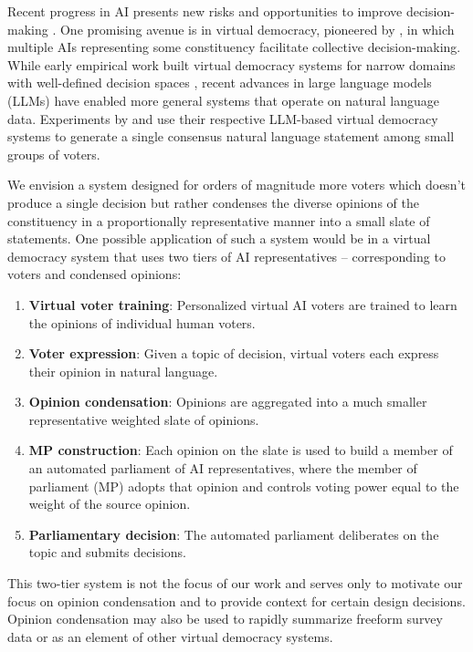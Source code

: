 \documentclass[11pt]{article}
\begin{document}
Recent progress in AI presents new risks and opportunities to improve decision-making \citep{landemore}. One promising avenue is in virtual democracy, pioneered by \citet{noothigattu-2018}, in which multiple AIs representing some constituency facilitate collective decision-making. While early empirical work built virtual democracy systems for narrow domains with well-defined decision spaces \citep{kahng-virtual-democracy, freedman-kidney-exchange}, recent advances in large language models (LLMs) have enabled more general systems that operate on natural language data. Experiments by \citet{bakker-consensus} and \citet{habermas-machine} use their respective LLM-based virtual democracy systems to generate a single consensus natural language statement among small groups of voters.

We envision a system designed for orders of magnitude more voters which doesn’t produce a single decision but rather condenses the diverse opinions of the constituency in a proportionally representative manner into a small slate of statements. One possible application of such a system would be in a virtual democracy system that uses two tiers of AI representatives – corresponding to voters and condensed opinions:

\begin{enumerate}
    \item \textbf{Virtual voter training}: Personalized virtual AI voters are trained to learn the opinions of individual human voters.
    \item \textbf{Voter expression}: Given a topic of decision, virtual voters each express their opinion in natural language.
    \item \textbf{Opinion condensation}: Opinions are aggregated into a much smaller representative weighted slate of opinions.
    \item \textbf{MP construction}: Each opinion on the slate is used to build a member of an automated parliament of AI representatives, where the member of parliament (MP) adopts that opinion and controls voting power equal to the weight of the source opinion.
    \item \textbf{Parliamentary decision}: The automated parliament deliberates on the topic and submits decisions.
\end{enumerate}

This two-tier system is not the focus of our work and serves only to motivate our focus on opinion condensation and to provide context for certain design decisions. Opinion condensation may also be used to rapidly summarize freeform survey data or as an element of other virtual democracy systems.
\end{document}
